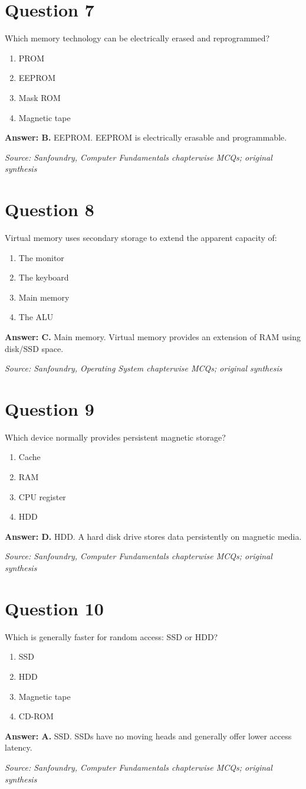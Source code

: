 \documentclass[11pt,a4paper]{book}
\newcommand{\source}[1]{\par\smallskip\textit{Source: #1}}
\newcommand{\answer}[2]{\par\textbf{Answer: #1.} #2}
\begin{document}
\section*{Question 7}
Which memory technology can be electrically erased and reprogrammed?
\begin{enumerate}[label=\Alph*.]
\item PROM
\item EEPROM
\item Mask ROM
\item Magnetic tape
\end{enumerate}
\answer{B}{EEPROM. EEPROM is electrically erasable and programmable.}
\source{Sanfoundry, Computer Fundamentals chapterwise MCQs; original synthesis}
\section*{Question 8}
Virtual memory uses secondary storage to extend the apparent capacity of:
\begin{enumerate}[label=\Alph*.]
\item The monitor
\item The keyboard
\item Main memory
\item The ALU
\end{enumerate}
\answer{C}{Main memory. Virtual memory provides an extension of RAM using disk/SSD space.}
\source{Sanfoundry, Operating System chapterwise MCQs; original synthesis}
\section*{Question 9}
Which device normally provides persistent magnetic storage?
\begin{enumerate}[label=\Alph*.]
\item Cache
\item RAM
\item CPU register
\item HDD
\end{enumerate}
\answer{D}{HDD. A hard disk drive stores data persistently on magnetic media.}
\source{Sanfoundry, Computer Fundamentals chapterwise MCQs; original synthesis}
\section*{Question 10}
Which is generally faster for random access: SSD or HDD?
\begin{enumerate}[label=\Alph*.]
\item SSD
\item HDD
\item Magnetic tape
\item CD-ROM
\end{enumerate}
\answer{A}{SSD. SSDs have no moving heads and generally offer lower access latency.}
\source{Sanfoundry, Computer Fundamentals chapterwise MCQs; original synthesis}
\end{document}
